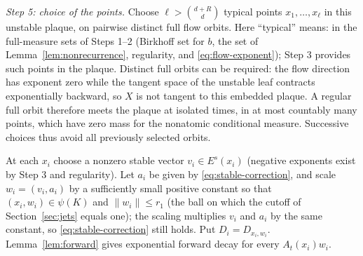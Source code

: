 \documentclass[11pt]{article}
\theoremstyle{remark}
\begin{document}
\emph{Step 5: choice of the points.}
Choose
\(\ell>\binom{d+R}{d}\) typical points \(x_1,\ldots,x_\ell\)
in this unstable plaque, on pairwise distinct full flow orbits.
Here ``typical'' means: in the full-measure sets of Steps 1--2
(Birkhoff set for \(b\), the set of Lemma~\ref{lem:nonrecurrence},
regularity, and \eqref{eq:flow-exponent}); Step 3 provides such points
in the plaque.
Distinct full orbits can be required: the flow direction has
exponent zero while the tangent space of the unstable leaf contracts
exponentially backward, so \(X\) is not tangent to this embedded
plaque.  A regular full orbit therefore meets the plaque at isolated
times, in at most countably many points, which have zero mass for
the nonatomic conditional measure.  Successive choices thus avoid
all previously selected orbits.


At each \(x_i\) choose a nonzero stable vector \(v_i\in E^s(x_i)\)
(negative exponents exist by Step 3 and regularity).
Let \(a_i\) be given by \eqref{eq:stable-correction}, and scale
\(w_i=(v_i,a_i)\) by a sufficiently small positive constant so that
\((x_i,w_i)\in\psi(K)\) and \(\|w_i\|\le r_1\) (the ball on which the
cutoff of Section~\ref{sec:jets} equals one); the scaling multiplies
\(v_i\) and \(a_i\) by the same constant, so
\eqref{eq:stable-correction} still holds.
Put \(D_i=D_{x_i,w_i}\).
Lemma~\ref{lem:forward} gives exponential forward decay for every
\(A_t(x_i)w_i\).
\end{document}
